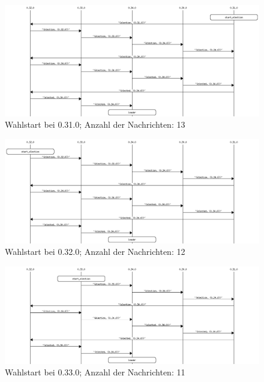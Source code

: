 \documentclass[a4paper,
12pt,
BCOR12mm,
]{scrartcl}
\theoremstyle{break}
\begin{document}
 \begin{figure}
   \begin{center}
     \includegraphics[scale=0.4]{../src/msc/single_election_at_0.31.0.png}
   \end{center}
   \caption{Wahlstart bei 0.31.0; Anzahl der Nachrichten: 13}
   \label{fig:s_31}
 \end{figure}

 \begin{figure}
   \begin{center}
     \includegraphics[scale=0.4]{../src/msc/single_election_at_0.32.0.png}
   \end{center}
   \caption{Wahlstart bei 0.32.0; Anzahl der Nachrichten: 12}
   \label{fig:s_32}
 \end{figure}

 \begin{figure}
   \begin{center}
     \includegraphics[scale=0.4]{../src/msc/single_election_at_0.33.0.png}
   \end{center}
   \caption{Wahlstart bei 0.33.0; Anzahl der Nachrichten: 11}
   \label{fig:s_33}
 \end{figure}
\end{document}
